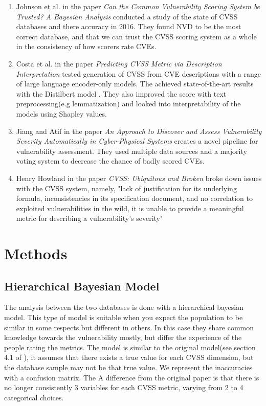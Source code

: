 \documentclass[12pt]{article}
\begin{document}
\begin{enumerate}
	\item Johnson et al. in the paper
	      \textit{Can the Common Vulnerability Scoring System be Trusted? A Bayesian
		      Analysis} \cite{bayes} conducted a study of the state of CVSS databases and there accuracy in 2016.
	      They found NVD to be the most correct database, and that we can trust the CVSS scoring system as a
	      whole in the consistency of how scorers rate CVEs.

	\item   Costa et al. in the paper \textit{Predicting CVSS Metric via Description Interpretation} tested
	      generation of CVSS from CVE descriptions with a range of large language encoder-only models. The
	      achieved state-of-the-art results with the Distilbert model \cite{distilbert}. They also improved
	      the score with text preprocessing(e.g lemmatization) and looked into interpretability of the models
	      using Shapley values.

	\item Jiang and Atif in the paper \textit{An Approach to Discover and Assess Vulnerability Severity
		      Automatically in Cyber-Physical Systems} \cite{jiang} creates a novel pipeline for vulnerability
	      assessment. They used multiple data sources and a majority voting system to decrease the chance of
	      badly scored CVEs.

	\item  Henry Howland in the paper \textit{CVSS: Ubiquitous and Broken} broke down issues with
	      the CVSS system, namely, "lack of justification for its underlying formula, inconsistencies
	      in its specification document, and no correlation to exploited vulnerabilities in the wild,
	      it is unable to provide a meaningful metric for describing a vulnerability’s severity"

\end{enumerate}

\section{Methods}

\subsection{Hierarchical Bayesian Model}

The analysis between the two databases is done with a hierarchical bayesian model. This type of
model is suitable when you expect the population to be similar in some respects but different in
others. In this case they share common knowledge towards the vulnerability mostly, but differ the
experience of the people rating the metrics. \cite{bayes} The model is similar to the original
model(see section 4.1 of  \cite{bayes}), it assumes that there exists a true value for each CVSS
dimension, but the database sample may not be that true value. We represent the inaccuracies with a
confusion matrix. The A difference from the original paper is that there is no longer consistently 3
variables for each CVSS metric, varying from 2 to 4 categorical choices. \\
\end{document}
